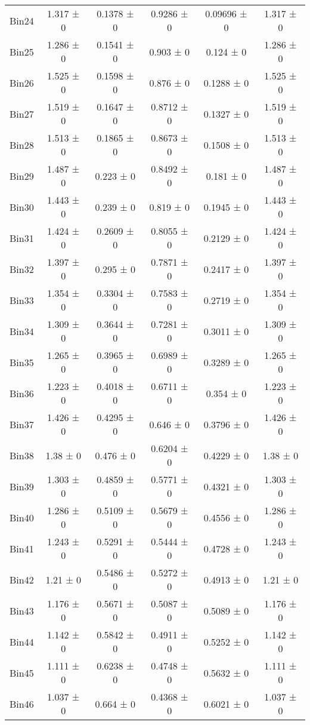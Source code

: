 \begin{tabular}{@{\extracolsep{4pt}}lccccc@{}}
     Bin24 & 1.317 ± 0 & 0.1378 ± 0 & 0.9286 ± 0 & 0.09696 ± 0 & 1.317 ± 0 \\ 
     Bin25 & 1.286 ± 0 & 0.1541 ± 0 & 0.903 ± 0 & 0.124 ± 0 & 1.286 ± 0 \\ 
     Bin26 & 1.525 ± 0 & 0.1598 ± 0 & 0.876 ± 0 & 0.1288 ± 0 & 1.525 ± 0 \\ 
     Bin27 & 1.519 ± 0 & 0.1647 ± 0 & 0.8712 ± 0 & 0.1327 ± 0 & 1.519 ± 0 \\ 
     Bin28 & 1.513 ± 0 & 0.1865 ± 0 & 0.8673 ± 0 & 0.1508 ± 0 & 1.513 ± 0 \\ 
     Bin29 & 1.487 ± 0 & 0.223 ± 0 & 0.8492 ± 0 & 0.181 ± 0 & 1.487 ± 0 \\ 
     Bin30 & 1.443 ± 0 & 0.239 ± 0 & 0.819 ± 0 & 0.1945 ± 0 & 1.443 ± 0 \\ 
     Bin31 & 1.424 ± 0 & 0.2609 ± 0 & 0.8055 ± 0 & 0.2129 ± 0 & 1.424 ± 0 \\ 
     Bin32 & 1.397 ± 0 & 0.295 ± 0 & 0.7871 ± 0 & 0.2417 ± 0 & 1.397 ± 0 \\ 
     Bin33 & 1.354 ± 0 & 0.3304 ± 0 & 0.7583 ± 0 & 0.2719 ± 0 & 1.354 ± 0 \\ 
     Bin34 & 1.309 ± 0 & 0.3644 ± 0 & 0.7281 ± 0 & 0.3011 ± 0 & 1.309 ± 0 \\ 
     Bin35 & 1.265 ± 0 & 0.3965 ± 0 & 0.6989 ± 0 & 0.3289 ± 0 & 1.265 ± 0 \\ 
     Bin36 & 1.223 ± 0 & 0.4018 ± 0 & 0.6711 ± 0 & 0.354 ± 0 & 1.223 ± 0 \\ 
     Bin37 & 1.426 ± 0 & 0.4295 ± 0 & 0.646 ± 0 & 0.3796 ± 0 & 1.426 ± 0 \\ 
     Bin38 & 1.38 ± 0 & 0.476 ± 0 & 0.6204 ± 0 & 0.4229 ± 0 & 1.38 ± 0 \\ 
     Bin39 & 1.303 ± 0 & 0.4859 ± 0 & 0.5771 ± 0 & 0.4321 ± 0 & 1.303 ± 0 \\ 
     Bin40 & 1.286 ± 0 & 0.5109 ± 0 & 0.5679 ± 0 & 0.4556 ± 0 & 1.286 ± 0 \\ 
     Bin41 & 1.243 ± 0 & 0.5291 ± 0 & 0.5444 ± 0 & 0.4728 ± 0 & 1.243 ± 0 \\ 
     Bin42 & 1.21 ± 0 & 0.5486 ± 0 & 0.5272 ± 0 & 0.4913 ± 0 & 1.21 ± 0 \\ 
     Bin43 & 1.176 ± 0 & 0.5671 ± 0 & 0.5087 ± 0 & 0.5089 ± 0 & 1.176 ± 0 \\ 
     Bin44 & 1.142 ± 0 & 0.5842 ± 0 & 0.4911 ± 0 & 0.5252 ± 0 & 1.142 ± 0 \\ 
     Bin45 & 1.111 ± 0 & 0.6238 ± 0 & 0.4748 ± 0 & 0.5632 ± 0 & 1.111 ± 0 \\ 
     Bin46 & 1.037 ± 0 & 0.664 ± 0 & 0.4368 ± 0 & 0.6021 ± 0 & 1.037 ± 0 \\ 

\end{tabular}
